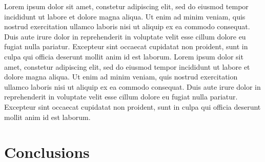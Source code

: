 \documentclass[11pt, a4paper]{article}
\newcommand{\lorem}{ \textcolor[rgb]{0.8,0.8,0.8}{Lorem ipsum dolor sit amet, constetur
adipiscing elit, sed do eiusmod tempor incididunt ut labore et dolore magna
aliqua. Ut enim ad minim veniam, quis nostrud exercitation ullamco laboris nisi
ut aliquip ex ea commodo consequat. Duis aute irure dolor in reprehenderit in
voluptate velit esse cillum dolore eu fugiat nulla pariatur. Excepteur sint
occaecat cupidatat non proident, sunt in culpa qui officia deserunt mollit anim
id est laborum.}}
\begin{document}






\lorem\lorem

\section{Conclusions}
\end{document}
